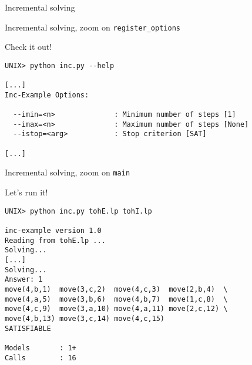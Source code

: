 %
%
%
%
%
\begin{frame}{Incremental solving}
  
\end{frame}
\begin{frame}{Incremental solving, zoom on \texttt{register\_options}}
  \bigskip
  
\end{frame}
\begin{frame}[fragile]{Check it out!}
\scriptsize\medskip
\begin{lstlisting}
UNIX> python inc.py --help

[...]
Inc-Example Options:

  --imin=<n>              : Minimum number of steps [1]
  --imax=<n>              : Maximum number of steps [None]
  --istop=<arg>           : Stop criterion [SAT]

[...]
\end{lstlisting}
\end{frame}
\begin{frame}{Incremental solving, zoom on \texttt{main}}
  \bigskip
  
\end{frame}
\begin{frame}[fragile]{Let's run it!}
\scriptsize\medskip
\begin{lstlisting}
UNIX> python inc.py tohE.lp tohI.lp

inc-example version 1.0
Reading from tohE.lp ...
Solving...
[...]
Solving...
Answer: 1
move(4,b,1)  move(3,c,2)  move(4,c,3)  move(2,b,4)  \
move(4,a,5)  move(3,b,6)  move(4,b,7)  move(1,c,8)  \
move(4,c,9)  move(3,a,10) move(4,a,11) move(2,c,12) \
move(4,b,13) move(3,c,14) move(4,c,15)
SATISFIABLE

Models       : 1+
Calls        : 16
\end{lstlisting}
\end{frame}
%
